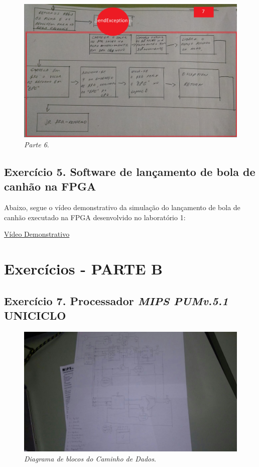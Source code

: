 \documentclass[12pt]{article}
\begin{document}
\begin{figure}[H]
	\flushleft
	\includegraphics[scale=0.12]{imagens/4.jpg}
	\caption{ \textit{Parte 6}.}
	\label{fig:ex1st}
\end{figure}


\subsection{Exercício 5. Software de lançamento de bola de canhão na FPGA}
\label{subsec:canhao}

Abaixo, segue o vídeo demonstrativo da simulação do lançamento de bola de canhão executado na FPGA desenvolvido no laboratório 1:

\href{https://youtu.be/ipDxgTOtXDA}{Vídeo Demonstrativo}


\section{Exercícios - PARTE B}
\label{sec:exerciciosB}

\subsection{Exercício 7. Processador \textit{MIPS PUMv.5.1} UNICICLO}
\label{subsec:mips_uniciclo}

\begin{figure}[H]
	\flushleft
	\includegraphics[scale=0.35]{imagens/diagrama.jpg}
	\caption{ \textit{Diagrama de blocos do Caminho de Dados}.}
	\label{fig:diagrama}
\end{figure}
\end{document}
